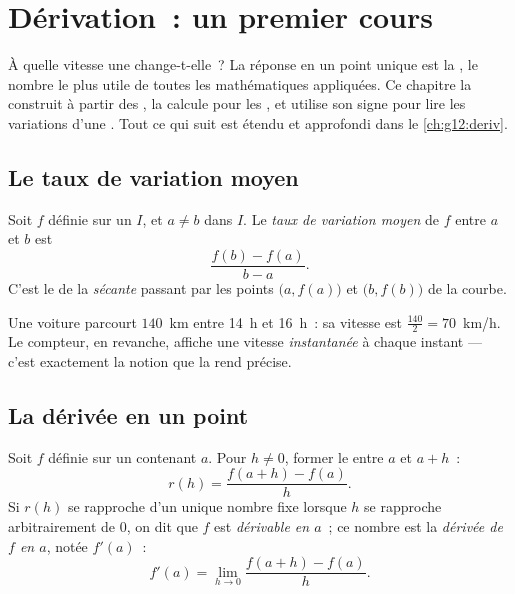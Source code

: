 \chapter{Dérivation~: un premier cours}\label{ch:g11:deriv}

À quelle vitesse une  change-t-elle~? La réponse en un point
unique est la \emph{}, le nombre le plus utile de toutes les
mathématiques appliquées. Ce chapitre la construit à partir des , la calcule pour les , et utilise
son signe pour lire les variations d'une . Tout ce qui suit est
étendu et approfondi dans le \cref{ch:g12:deriv}.

\section{Le taux de variation moyen}

\begin{definition}\label{def:g11:deriv:rate}
Soit $f$ définie sur un  $I$, et $a \neq b$ dans $I$. Le
\emph{taux de variation moyen} de $f$
entre $a$ et $b$ est
\[
\frac{f(b) - f(a)}{b - a}.
\]
C'est le  de la \emph{sécante} passant par les
points $\bigl(a, f(a)\bigr)$ et $\bigl(b, f(b)\bigr)$ de la courbe.
\end{definition}

\begin{example}
Une voiture parcourt $140$~km entre 14~h et 16~h~: sa vitesse  est
$\frac{140}{2} = 70$~km/h. Le compteur, en revanche, affiche une vitesse
\emph{instantanée} à chaque instant --- c'est exactement la notion que
la  rend précise.
\end{example}

\section{La dérivée en un point}

\begin{definition}\label{def:g11:deriv:derivative}
Soit $f$ définie sur un  contenant $a$. Pour $h \neq 0$, former
le  entre $a$ et $a + h$~:
\[
r(h) = \frac{f(a+h) - f(a)}{h}.
\]
Si $r(h)$ se rapproche d'un unique nombre fixe lorsque $h$ se rapproche
arbitrairement de $0$, on dit que $f$ est \emph{dérivable en
$a$}~; ce nombre est la \emph{dérivée de $f$ en $a$},
notée $f'(a)$~:
\[
f'(a) = \lim_{h \to 0} \frac{f(a+h) - f(a)}{h}.
\]
\end{definition}


